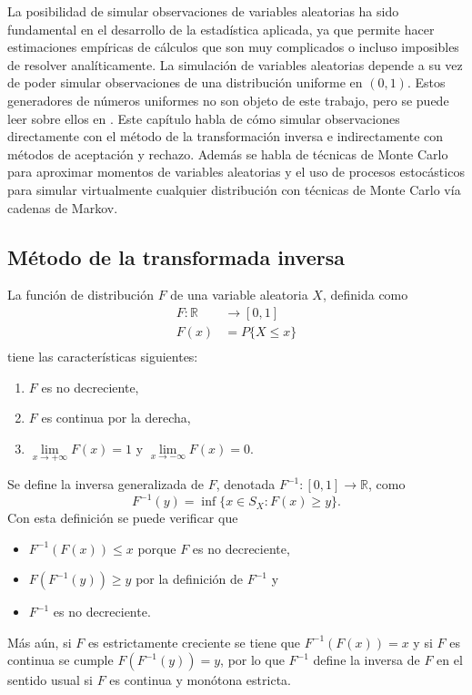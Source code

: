 \documentclass[11pt,a4paper]{article}
\begin{document}
La posibilidad de simular observaciones de variables aleatorias ha sido fundamental en el desarrollo de la estadística aplicada, ya que permite hacer estimaciones empíricas de cálculos que son muy complicados o incluso imposibles de resolver analíticamente. La simulación de variables aleatorias depende a su vez de poder simular observaciones de una distribución uniforme en $(0, 1)$. Estos generadores de números uniformes no son objeto de este trabajo, pero se puede leer sobre ellos en \citet{dagpunar}. Este capítulo habla de cómo simular observaciones directamente con el método de la transformación inversa e indirectamente con métodos de aceptación y rechazo. Además se habla de técnicas de Monte Carlo para aproximar momentos de variables aleatorias y el uso de procesos estocásticos para simular virtualmente cualquier distribución con técnicas de Monte Carlo vía cadenas de Markov.\\

\subsection{Método de la transformada inversa}
\label{sec:transformada}

La función de distribución $F$ de una variable aleatoria $X$, definida como
\begin{align*}
F: \mathbb{R}&\to [0,1]\\
F(x) &= P\{X \leq x\}\\
\end{align*}
tiene las características siguientes:

\begin{enumerate}
\item $F$ es no decreciente,
\item $F$ es continua por la derecha,
\item $\lim\limits_{x\to +\infty}F(x) = 1$ y $\lim\limits_{x\to -\infty}F(x) = 0$.
\end{enumerate}
Se define la inversa generalizada de $F$, denotada $F^{-1}:[0,1]\to \mathbb{R}$, como $$F^{-1}(y) = \inf \{x\in S_X: F(x) \geq y\}.$$ Con esta definición se puede verificar que
\begin{itemize}
\item $F^{-1}(F(x)) \leq x$ porque $F$ es no decreciente,
\item $F(F^{-1}(y)) \geq y$ por la definición de $F^{-1}$ y
\item $F^{-1}$ es no decreciente.
\end{itemize}
Más aún, si $F$ es estrictamente creciente se tiene que $F^{-1}(F(x)) = x$ y si $F$ es continua se cumple $F(F^{-1}(y)) = y$, por lo que $F^{-1}$ define la inversa de $F$ en el sentido usual si $F$ es continua y monótona estricta.\\
\end{document}
